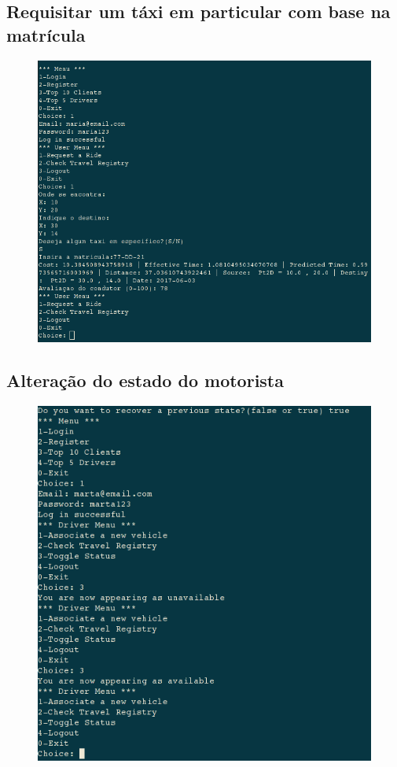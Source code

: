 \documentclass[a4paper,10pt,portuguese]{article}
\begin{document}
\subsection{Requisitar um táxi em particular com base na matrícula}
\begin{figure}[ht!]
    \centering
    \includegraphics[width=120mm]{fazerViagemComMatricula.png}
\end{figure}

\subsection{Alteração do estado do motorista}
\begin{figure}[ht!]
    \centering
    \includegraphics[width=120mm]{mudarEstado.png}
\end{figure}
\end{document}
